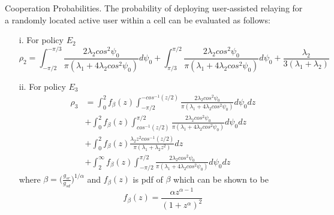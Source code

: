 \begin{theorem}{Cooperation Probabilities.}
The probability of
deploying user-assisted relaying for a randomly located active
user within a cell can be evaluated as follows:
\begin{itemize}
\item[i.] For policy $E_2$
\begin{equation}
\rho_2 = \int_{-\pi/2}^{-\pi/3}\frac{2\lambda_2 cos^2\psi_0}{\pi(\lambda_1+4\lambda_2cos^2\psi_0)}d\psi_0 + \int_{\pi/3}^{\pi/2}\frac{2\lambda_2 cos^2\psi_0}{\pi(\lambda_1+4\lambda_2cos^2\psi_0)}d\psi_0 + \frac{\lambda_2}{3(\lambda_1+\lambda_2)}
\end{equation}
\item[ii.] For policy $E_3$
\begin{align*}
\rho_3 &= \int_0^2 f_{\beta}(z)\int_{-\pi/2}^{-cos^{-1}(z/2)}\frac{2\lambda_2 cos^2\psi_0}{\pi(\lambda_1+4\lambda_2cos^2\psi_0)}d\psi_0 dz \\ 
&+ \int_0^2 f_{\beta}(z)\int^{\pi/2}_{cos^{-1}(z/2)}\frac{2\lambda_2 cos^2\psi_0}{\pi(\lambda_1+4\lambda_2cos^2\psi_0)}d\psi_0 dz \\ &+\int_0^2 f_{\beta}(z)\frac{\lambda_2 z^2 cos^{-1}(z/2)}{\pi(\lambda_1+\lambda_2z^2)}dz \\ 
&+ \int_2^{\infty} f_{\beta}(z)\int_{-\pi/2}^{\pi/2}\frac{2\lambda_2 cos^2\psi_0}{\pi(\lambda_1+4\lambda_2cos^2\psi_0)}d\psi_0 dz
\end{align*}
where $\beta = \bigg(\frac{g_{sr}}{g_{sd}}\bigg)^{1/\alpha}$ and $f_{\beta}(z)$ is pdf of $\beta$ which can be shown to be 
\begin{equation}
f_{\beta}(z) = \frac{\alpha z^{\alpha-1}}{(1+z^{\alpha})^2}
\end{equation}
\end{itemize}
\end{theorem}
